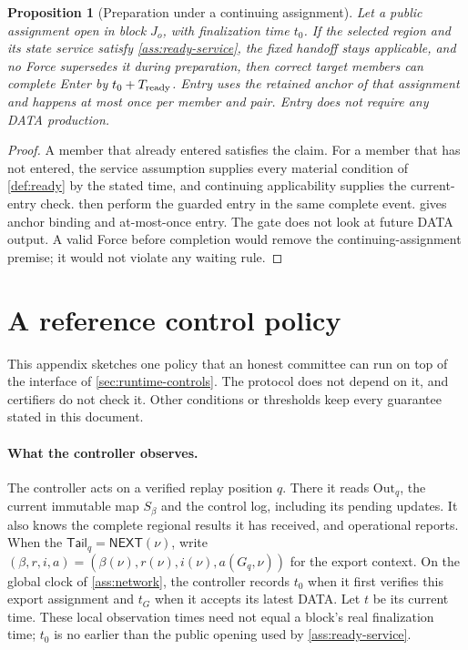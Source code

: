 \documentclass[11pt,a4paper]{article}
\newcommand{\tagg}[1]{\ensuremath{\mathsf{#1}}}
\newtheorem{proposition}[proposition]{Proposition}
\newcounter{protocol}
\begin{document}
\begin{proposition}[Preparation under a continuing assignment]
\label{prop:ready-bound}
Let a public assignment open in block $J_o$, with finalization time
$t_0$. If the selected region and its state service satisfy
\cref{ass:ready-service}, the fixed handoff stays applicable, and no
Force supersedes it during preparation, then correct target members can
complete Enter by $t_0+T_{\rm ready}$. Entry uses the retained
anchor of that assignment and happens at most once per member and pair.
Entry does not require any DATA production.
\end{proposition}
\begin{proof}
A member that already entered satisfies the claim. For a member that has
not entered, the service assumption supplies every material condition of
\cref{def:ready} by the stated time, and continuing applicability
supplies the current-entry check.  then
perform the guarded entry in the same complete event.
 gives anchor binding and at-most-once
entry. The gate does not look at future DATA output. A valid Force before
completion would remove the continuing-assignment premise; it would not
violate any waiting rule.
\end{proof}

\section{A reference control policy}
\label{app:policy}
This appendix sketches one policy that an honest committee can run on
top of the interface of \cref{sec:runtime-controls}. The protocol does
not depend on it, and certifiers do not check it. Other conditions or
thresholds keep every guarantee stated in this document.

\paragraph{What the controller observes.}
The controller acts on a verified replay position $q$. There it reads
$\mathrm{Out}_q$, the current immutable map $S_\beta$ and the
control log, including its pending updates. It also knows the complete
regional results it has received, and operational reports. When the
$\mathsf{Tail}_q=\tagg{NEXT}(\nu)$, write
$(\beta,r,i,a)=(\beta(\nu),r(\nu),i(\nu),a(G_q,\nu))$
for the export context. On the global clock of \cref{ass:network},
the controller records $t_0$ when it first verifies this export
assignment and $t_G$ when it accepts its latest DATA. Let $t$ be its
current time. These local observation times need not equal a block's
real finalization time; $t_0$ is no earlier than the public opening used
by \cref{ass:ready-service}.
\end{document}
